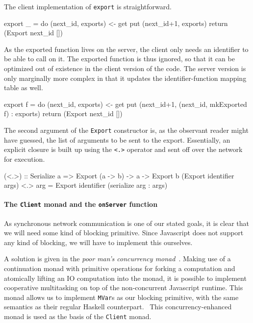 \documentclass[preprint]{sigplanconf}
\begin{document}
The client implementation of \lstinline!export! is straightforward.

\begin{code}
export _ = do
  (next_id, exports) <- get
  put (next_id+1, exports)
  return (Export next_id [])
\end{code}

As the exported function lives on the server, the client only needs an
identifier to be able to call on it. The exported function is thus ignored,
so that it can be optimized out of existence in the client version of the code.
The server version is only marginally more complex in that it updates the
identifier-function mapping table as well.

\begin{code}
export f = do
  (next_id, exports) <- get
  put (next_id+1, (next_id, mkExported f) : exports)
  return (Export next_id [])
\end{code}

The second argument of the \lstinline!Export! constructor is, as the observant
reader might have guessed, the list of arguments to be sent to the export.
Essentially, an explicit closure is built up using the \lstinline!<.>! operator
and sent off over the network for execution.

\begin{code}
(<.>) :: Serialize a
      => Export (a -> b) -> a -> Export b
(Export identifier args) <.> arg =
  Export identifier (serialize arg : args)
\end{code}

\paragraph{The \lstinline!Client! monad and the \lstinline!onServer! function}
As synchronous network communication is one of our stated goals, it is clear
that we will need some kind of blocking primitive. Since Javascript does not
support any kind of blocking, we will have to implement this ourselves.

A solution is given in the \emph{poor man's concurrency
monad}\ \cite{concurrencymonad}. Making use of a continuation monad with
primitive operations for forking a computation and atomically lifting an IO
computation into the monad, it is possible to implement cooperative
multitasking on top of the non-concurrent Javascript runtime. This monad
allows us to implement \lstinline!MVar!s as our blocking primitive, with the
same semantics as their regular Haskell counterpart.\ \cite{ffi}
This concurrency-enhanced monad is used as the basis of the \lstinline!Client!
monad.
\end{document}
